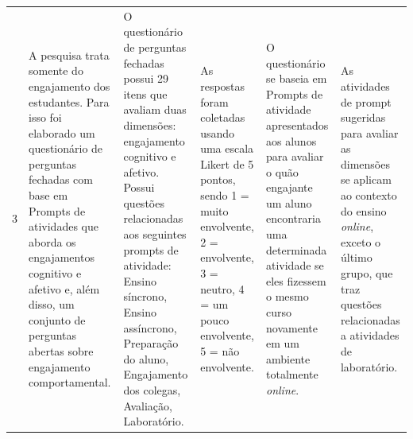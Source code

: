 \documentclass[portuguese]{textolivre}
\begin{document}
\begin{small}
\begin{longtable}{p{}p{}p{}p{}p{}p{}
    }
3 & A pesquisa trata somente do engajamento dos estudantes. Para isso foi elaborado um questionário de perguntas fechadas com base em Prompts de atividades que aborda os engajamentos cognitivo e afetivo e, além disso, um conjunto de perguntas abertas sobre engajamento comportamental. & O questionário de perguntas fechadas possui 29 itens que avaliam duas dimensões: engajamento cognitivo e afetivo. Possui questões relacionadas aos seguintes prompts de atividade: Ensino síncrono, Ensino assíncrono, Preparação do aluno, Engajamento dos colegas, Avaliação, Laboratório. & As respostas foram coletadas usando uma escala Likert de 5 pontos, sendo 1 = muito envolvente, 2 = envolvente, 3 = neutro, 4 = um pouco envolvente, 5 = não envolvente. & O questionário se baseia em Prompts de atividade apresentados aos alunos para avaliar o quão engajante um aluno encontraria uma determinada atividade se eles fizessem o mesmo curso novamente em um ambiente totalmente \textit{online}. & As atividades de prompt sugeridas para avaliar as dimensões se aplicam ao contexto do ensino \textit{online}, exceto o último grupo, que traz questões relacionadas a atividades de laboratório.


\end{longtable}
\end{small}
\end{document}
